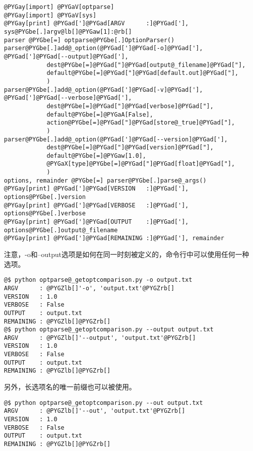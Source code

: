 \documentclass[a4paper,10pt,english]{manual}
\begin{document}
\begin{Verbatim}[commandchars=@\[\]]
@PYGay[import] @PYGaV[optparse]
@PYGay[import] @PYGaV[sys]
@PYGay[print] @PYGad[']@PYGad[ARGV      :]@PYGad['], sys@PYGbe[.]argv@lb[]@PYGaw[1]:@rb[]
parser @PYGbe[=] optparse@PYGbe[.]OptionParser()
parser@PYGbe[.]add@_option(@PYGad[']@PYGad[-o]@PYGad['], @PYGad[']@PYGad[--output]@PYGad['],
            dest@PYGbe[=]@PYGad["]@PYGad[output@_filename]@PYGad["],
            default@PYGbe[=]@PYGad["]@PYGad[default.out]@PYGad["],
            )
parser@PYGbe[.]add@_option(@PYGad[']@PYGad[-v]@PYGad['], @PYGad[']@PYGad[--verbose]@PYGad['],
            dest@PYGbe[=]@PYGad["]@PYGad[verbose]@PYGad["],
            default@PYGbe[=]@PYGaA[False],
            action@PYGbe[=]@PYGad["]@PYGad[store@_true]@PYGad["],
            )
parser@PYGbe[.]add@_option(@PYGad[']@PYGad[--version]@PYGad['],
            dest@PYGbe[=]@PYGad["]@PYGad[version]@PYGad["],
            default@PYGbe[=]@PYGaw[1.0],
            @PYGaX[type]@PYGbe[=]@PYGad["]@PYGad[float]@PYGad["],
            )
options, remainder @PYGbe[=] parser@PYGbe[.]parse@_args()
@PYGay[print] @PYGad[']@PYGad[VERSION   :]@PYGad['], options@PYGbe[.]version
@PYGay[print] @PYGad[']@PYGad[VERBOSE   :]@PYGad['], options@PYGbe[.]verbose
@PYGay[print] @PYGad[']@PYGad[OUTPUT    :]@PYGad['], options@PYGbe[.]output@_filename
@PYGay[print] @PYGad[']@PYGad[REMAINING :]@PYGad['], remainder
\end{Verbatim}

注意，-o和--output选项是如何在同一时刻被定义的，命令行中可以使用任何一种选项。

\begin{Verbatim}[commandchars=@\[\]]
@$ python optparse@_getoptcomparison.py -o output.txt
ARGV      : @PYGZlb[]'-o', 'output.txt'@PYGZrb[]
VERSION   : 1.0
VERBOSE   : False
OUTPUT    : output.txt
REMAINING : @PYGZlb[]@PYGZrb[]
@$ python optparse@_getoptcomparison.py --output output.txt
ARGV      : @PYGZlb[]'--output', 'output.txt'@PYGZrb[]
VERSION   : 1.0
VERBOSE   : False
OUTPUT    : output.txt
REMAINING : @PYGZlb[]@PYGZrb[]
\end{Verbatim}

另外，长选项名的唯一前缀也可以被使用。

\begin{Verbatim}[commandchars=@\[\]]
@$ python optparse@_getoptcomparison.py --out output.txt
ARGV      : @PYGZlb[]'--out', 'output.txt'@PYGZrb[]
VERSION   : 1.0
VERBOSE   : False
OUTPUT    : output.txt
REMAINING : @PYGZlb[]@PYGZrb[]
\end{Verbatim}
\end{document}
